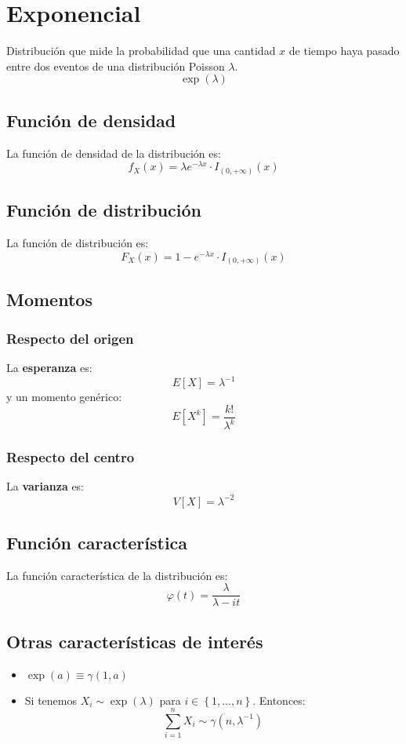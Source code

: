 \section{Exponencial}
\label{sec:exponencial}
Distribución que mide la probabilidad que una cantidad $x$ de tiempo haya pasado entre 
dos eventos de una distribución Poisson $\lambda$.
\[
\boxed{\exp\left( \lambda \right)}
\]

\subsection{Función de densidad}
La función de densidad de la distribución es:
\[
f_X \left( x \right) = \lambda e^{-\lambda x} \cdot I_{\left( 0, +\infty \right)}\left( x \right)
\]

\subsection{Función de distribución}
La función de distribución es:
\[
F_X\left( x \right) = 1 - e^{-\lambda x} \cdot I_{\left( 0, +\infty \right)}\left( x \right)
\]

\subsection{Momentos}

\subsubsection*{Respecto del origen}
La \textbf{esperanza} es: 
\[
    E\left[ X \right] = \lambda^{-1}
\]
y un momento genérico: 
\[
    E\left[ X^k \right] = \frac{k!}{\lambda^k}
\]
\subsubsection*{Respecto del centro}
La \textbf{varianza} es:
\[
    V\left[ X \right] = \lambda^{-2}
\]

\subsection{Función característica}
La función característica de la distribución es:
\[
\varphi\left( t \right) = \frac{\lambda}{\lambda - it}
\]

\subsection{Otras características de interés}
\begin{itemize}
    \item $\exp\left( a \right) \equiv \gamma\left( 1, a \right)$
    \item Si tenemos $X_i \sim \exp\left( \lambda \right)$ para $i \in \left\{ 1, \ldots, n \right\}$. Entonces:
    \[
    \sum_{i=1}^{n} X_i \sim \gamma \left( n, \lambda^{-1} \right) 
    \]
\end{itemize}

